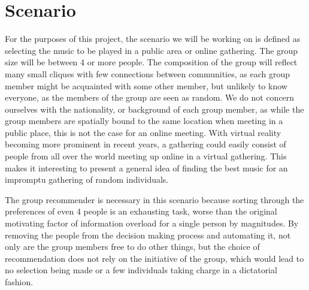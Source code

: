 \section{Scenario}\label{sec:introduction_scenario}

For the purposes of this project, the scenario we will be working on is defined as selecting the music to be played in a public area or online gathering. The group size will be between 4 or more people. The composition of the group will reflect many small cliques with few connections between communities, as each group member might be acquainted with some other member, but unlikely to know everyone, as the members of the group are seen as random. We do not concern ourselves with the nationality, or background of each group member, as while the group members are spatially bound to the same location when meeting in a public place, this is not the case for an online meeting. With virtual reality becoming more prominent in recent years, a gathering could easily consist of people from all over the world meeting up online in a virtual gathering. This makes it interesting to present a general idea of finding the best music for an impromptu gathering of random individuals. %

The group recommender is necessary in this scenario because sorting through the preferences of even 4 people is an exhausting task, worse than the original motivating factor of information overload for a single person by magnitudes. By removing the people from the decision making process and automating it, not only are the group members free to do other things, but the choice of recommendation does not rely on the initiative of the group, which would lead to no selection being made or a few individuals taking charge in a dictatorial fashion.

